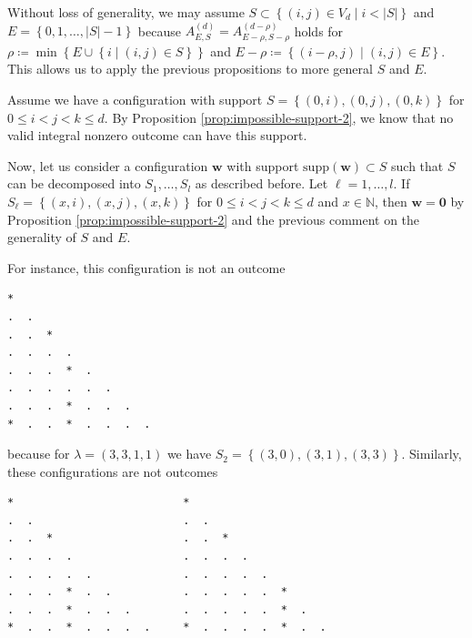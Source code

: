 \begin{remark}\label{rem:generality-jfknwejn}
    Without loss of generality, we may assume \(  S \subset \left\{ (i,j) \in V_d \mid i < \lvert S \rvert \right\} \) and \( E = \left\{ 0,1, \dots, \lvert S \rvert - 1 \right\} \)
because \( A^{(d)}_{E,S} = A^{(d-\rho)}_{E - \rho, S - \rho} \) holds for \( \rho \coloneqq \min \left\{ E \cup \left\{ i \mid (i,j) \in S \right\} \right\} \) and \( E - \rho \coloneqq \left\{ (i - \rho, j) \mid (i,j) \in E \right\} \). This allows us to apply the previous propositions to more general \( S \) and \( E \).
\end{remark}

\begin{example}
    Assume we have a configuration with support \( S = \left\{ (0,i), (0,j), (0,k) \right\} \) for \( 0 \leq i < j< k \leq d \). By Proposition \ref{prop:impossible-support-2}, we know that no valid integral nonzero outcome can have this support.

    Now, let us consider a configuration \( \mathbf{w} \) with support \( \mathrm{supp}(\mathbf{w}) \subset S \) such that \( S \) can be decomposed into \( S_1, \dots, S_l \) as described before. Let \( \ell = 1, \dots, l \). If \( S_\ell = \left\{ (x,i), (x,j), (x,k) \right\} \) for \( 0 \leq i < j< k \leq d \) and \( x \in \mathbb{N} \), then \( \mathbf{w} = \mathbf 0 \) by Proposition \ref{prop:impossible-support-2} and the previous comment on the generality of \( S \) and \( E \). 

    For instance, this configuration is not an outcome
    \begin{verbatim}
*
.  .
.  .  *  
.  .  .  .  
.  .  .  *  .  
.  .  .  .  .  .  
.  .  .  *  .  .  .  
*  .  .  *  .  .  .  .  
    \end{verbatim}
    because for \( \lambda = (3,3,1,1) \) we have \( S_2 = \left\{ (3,0), (3,1), (3,3) \right\} \). Similarly, these configurations are not outcomes
    \begin{verbatim}
*                          *
.  .                       .  .
.  .  *                    .  .  *  
.  .  .  .                 .  .  .  . 
.  .  .  .  .              .  .  .  .  .
.  .  .  *  .  .           .  .  .  .  .  * 
.  .  .  *  .  .  .        .  .  .  .  .  *  .  
*  .  .  *  .  .  .  .     *  .  .  .  .  *  .  .  
    \end{verbatim}
\end{example}